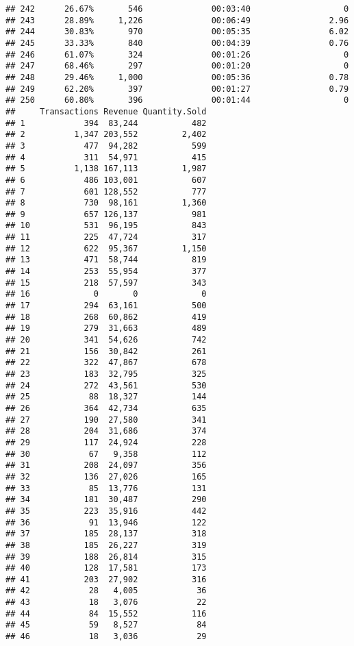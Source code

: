 \documentclass[
]{article}
\begin{document}
\begin{verbatim}
## 242      26.67%       546              00:03:40                   0
## 243      28.89%     1,226              00:06:49                2.96
## 244      30.83%       970              00:05:35                6.02
## 245      33.33%       840              00:04:39                0.76
## 246      61.07%       324              00:01:26                   0
## 247      68.46%       297              00:01:20                   0
## 248      29.46%     1,000              00:05:36                0.78
## 249      62.20%       397              00:01:27                0.79
## 250      60.80%       396              00:01:44                   0
##     Transactions Revenue Quantity.Sold
## 1            394  83,244           482
## 2          1,347 203,552         2,402
## 3            477  94,282           599
## 4            311  54,971           415
## 5          1,138 167,113         1,987
## 6            486 103,001           607
## 7            601 128,552           777
## 8            730  98,161         1,360
## 9            657 126,137           981
## 10           531  96,195           843
## 11           225  47,724           317
## 12           622  95,367         1,150
## 13           471  58,744           819
## 14           253  55,954           377
## 15           218  57,597           343
## 16             0       0             0
## 17           294  63,161           500
## 18           268  60,862           419
## 19           279  31,663           489
## 20           341  54,626           742
## 21           156  30,842           261
## 22           322  47,867           678
## 23           183  32,795           325
## 24           272  43,561           530
## 25            88  18,327           144
## 26           364  42,734           635
## 27           190  27,580           341
## 28           204  31,686           374
## 29           117  24,924           228
## 30            67   9,358           112
## 31           208  24,097           356
## 32           136  27,026           165
## 33            85  13,776           131
## 34           181  30,487           290
## 35           223  35,916           442
## 36            91  13,946           122
## 37           185  28,137           318
## 38           185  26,227           319
## 39           188  26,814           315
## 40           128  17,581           173
## 41           203  27,902           316
## 42            28   4,005            36
## 43            18   3,076            22
## 44            84  15,552           116
## 45            59   8,527            84
## 46            18   3,036            29

\end{verbatim}
\end{document}
